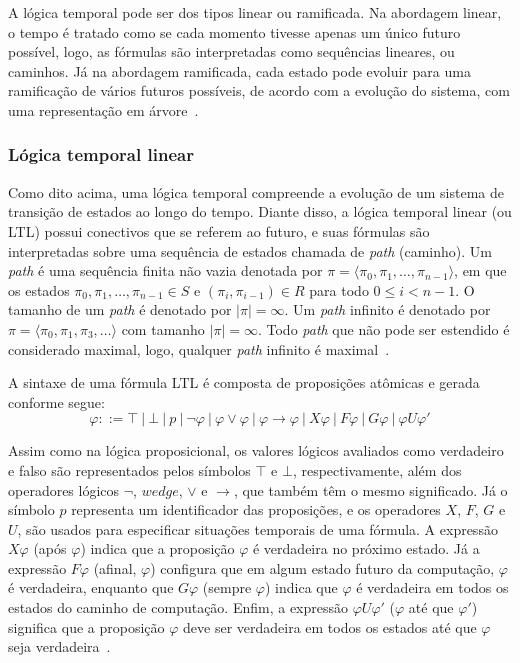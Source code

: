 A lógica temporal pode ser dos tipos linear ou ramificada. Na abordagem linear, o tempo é tratado como se cada momento tivesse apenas um único futuro possível, logo, as fórmulas são interpretadas como sequências lineares, ou caminhos. Já na abordagem ramificada, cada estado pode evoluir para uma ramificação de vários futuros possíveis, de acordo com a evolução do sistema, com uma representação em árvore~\cite{mura2016}.

\subsubsection{Lógica temporal linear}

Como dito acima, uma lógica temporal compreende a evolução de um sistema de transição de estados ao longo do tempo. Diante disso, a lógica temporal linear (ou LTL) possui conectivos que se referem ao futuro, e suas fórmulas são interpretadas sobre uma sequência de estados chamada de \textit{path} (caminho). Um \textit{path} é uma sequência finita não vazia denotada por $\pi = \langle \pi_{0}, \pi_{1}, \ldots, \pi_{n-1} \rangle$, em que os estados $\pi_{0}, \pi_{1}, \ldots, \pi_{n-1} \in S$ e $(\pi_{i}, \pi_{i-1}) \in R$ para todo $0 \leq i < n-1$. O tamanho de um \textit{path} é denotado por $|\pi|=\infty$. Um \textit{path} infinito é denotado por $\pi = \langle \pi_{0}, \pi_{1}, \pi_{3}, \ldots \rangle$ com tamanho $|\pi| = \infty$. Todo \textit{path} que não pode ser estendido é considerado maximal, logo, qualquer \textit{path} infinito é maximal~\cite{muller1999invited}.

A sintaxe de uma fórmula LTL é composta de proposições atômicas e gerada conforme segue:
\begin{equation}
\varphi ::= \top~|~\bot~|~p~|~\neg \varphi~|~\varphi \vee \varphi~|~\varphi \rightarrow \varphi~|~X\varphi~|~F\varphi~|~G\varphi~|~\varphi U \varphi'
\end{equation}

Assim como na lógica proposicional, os valores lógicos avaliados como verdadeiro e falso são representados pelos símbolos $\top$ e $\bot$, respectivamente, além dos operadores lógicos $\neg$, $wedge$, $\vee$ e $\rightarrow$, que também têm o mesmo significado. Já o símbolo $p$ representa um identificador das proposições, e os operadores $X$, $F$, $G$ e $U$, são usados para especificar situações temporais de uma fórmula. A expressão $X\varphi$ (após $\varphi$) indica que a proposição $\varphi$ é verdadeira no próximo estado. Já a expressão $F\varphi$ (afinal, $\varphi$) configura que em algum estado futuro da computação, $\varphi$ é verdadeira, enquanto que $G\varphi$ (sempre $\varphi$) indica que $\varphi$ é verdadeira em todos os estados do caminho de computação. Enfim, a expressão $\varphi U \varphi'$ ($\varphi$ até que $\varphi'$) significa que a proposição $\varphi$ deve ser verdadeira em todos os estados até que $\varphi$ seja verdadeira~\cite{mura2016, muller1999invited}. 

